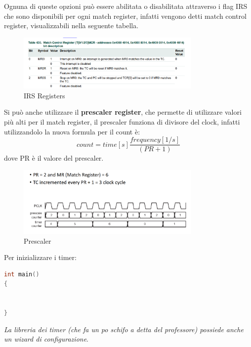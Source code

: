\documentclass[12pt]{article}
\begin{document}
Ognuna di queste opzioni pu\`o essere abilitata o disabilitata attraverso i flag IRS che sono disponibili per ogni match register, infatti vengono detti match control register, visualizzabili nella seguente tabella.
\begin{figure}[H]
    \centering
    \includegraphics[width=0.8\textwidth]{irs-registers.png}
    \caption{IRS Registers}
    \label{fig:irs-registers}
\end{figure}


Si pu\`o anche utilizzare il \textbf{prescaler register}, che permette di utilizzare valori pi\`u alti per il match register, il prescaler funziona di divisore del clock, infatti utilizzandolo la nuova formula per il count \`e:
\[ count = time[s] \frac{frequency[1/s]}{(PR + 1)} \]
dove PR \`e il valore del prescaler.
\begin{figure}[H]
    \centering
    \includegraphics[width=0.8\textwidth]{prescaler.png}
    \caption{Prescaler}
    \label{fig:prescaler}
\end{figure}

Per inizializzare i timer:
\begin{lstlisting}[language=C]
int main()
{
    

}
\end{lstlisting}
\emph{La libreria dei timer (che fa un po schifo a detta del professore) possiede anche un wizard di configurazione}.
\end{document}
